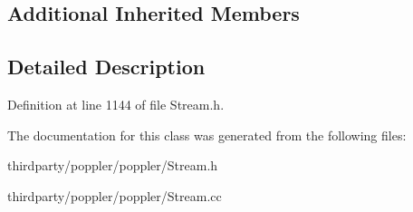\subsection*{Additional Inherited Members}


\subsection{Detailed Description}


Definition at line 1144 of file Stream.\+h.



The documentation for this class was generated from the following files\+:\begin{DoxyCompactItemize}
\item 
thirdparty/poppler/poppler/Stream.\+h\item 
thirdparty/poppler/poppler/Stream.\+cc\end{DoxyCompactItemize}
